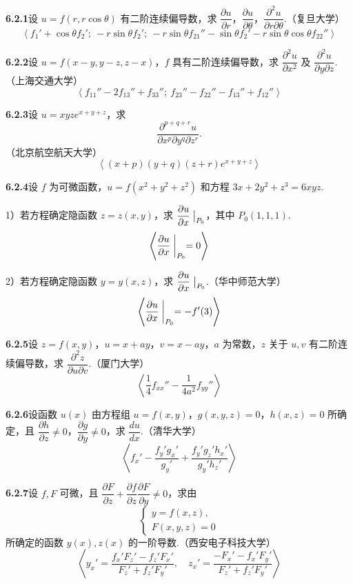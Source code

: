 \documentclass[UTF8,12pt,a4paper,fontset=fandol]{ctexart}
\begin{document}
\noindent\textbf{6.2.1}\quad 设 $u=f(r,r\cos\theta)$ 有二阶连续偏导数，求 $\dfrac{\partial u}{\partial r}$，$\dfrac{\partial u}{\partial\theta}$，$\dfrac{\partial^2u}{\partial r\partial\theta}$.（复旦大学）
\[
  \left\langle f_1'+\cos\theta f_2';\ -r\sin\theta f_2';\
  -r\sin\theta f_{21}''-\sin\theta f_2'-r\sin\theta\cos\theta f_{22}''\right\rangle
\]

\noindent\textbf{6.2.2}\quad 设 $u=f(x-y,y-z,z-x)$，$f$ 具有二阶连续偏导数，求 $\dfrac{\partial^2u}{\partial x^2}$ 及 $\dfrac{\partial^2u}{\partial y\partial z}$.（上海交通大学）
\[
  \left\langle f_{11}''-2f_{13}''+f_{33}'';\
  f_{23}''-f_{22}''-f_{13}''+f_{12}''\right\rangle
\]

\noindent\textbf{6.2.3}\quad 设 $u=xyze^{x+y+z}$，求
\[
  \frac{\partial^{p+q+r}u}{\partial x^p\partial y^q\partial z^r}.
\]
（北京航空航天大学）
\[
  \left\langle (x+p)(y+q)(z+r)e^{x+y+z}\right\rangle
\]

\noindent\textbf{6.2.4}\quad 设 $f$ 为可微函数，$u=f(x^2+y^2+z^2)$ 和方程 $3x+2y^2+z^3=6xyz$.

1）若方程确定隐函数 $z=z(x,y)$，求 $\dfrac{\partial u}{\partial x}\bigm|_{P_0}$，其中 $P_0(1,1,1)$.
\[
  \left\langle \frac{\partial u}{\partial x}\biggm|_{P_0}=0\right\rangle
\]

2）若方程确定隐函数 $y=y(x,z)$，求 $\dfrac{\partial u}{\partial x}\bigm|_{P_0}$.（华中师范大学）
\[
  \left\langle \frac{\partial u}{\partial x}\biggm|_{P_0}=-f'(3)\right\rangle
\]

\noindent\textbf{6.2.5}\quad 设 $z=f(x,y)$，$u=x+ay$，$v=x-ay$，$a$ 为常数，$z$ 关于 $u,v$ 有二阶连续偏导数，求 $\dfrac{\partial^2z}{\partial u\partial v}$.（厦门大学）
\[
  \left\langle \frac14f_{xx}''-\frac1{4a^2}f_{yy}''\right\rangle
\]

\noindent\textbf{6.2.6}\quad 设函数 $u(x)$ 由方程组 $u=f(x,y)$，$g(x,y,z)=0$，$h(x,z)=0$ 所确定，且 $\dfrac{\partial h}{\partial z}\ne0$，$\dfrac{\partial g}{\partial y}\ne0$，求 $\dfrac{du}{dx}$.（清华大学）
\[
  \left\langle f_x'-\frac{f_y'g_x'}{g_y'}+\frac{f_y'g_z'h_x'}{g_y'h_z'}\right\rangle
\]

\noindent\textbf{6.2.7}\quad 设 $f,F$ 可微，且 $\dfrac{\partial F}{\partial z}+\dfrac{\partial f}{\partial z}\dfrac{\partial F}{\partial y}\ne0$，求由
\[
  \begin{cases}
  y=f(x,z),\\
  F(x,y,z)=0
  \end{cases}
\]
所确定的函数 $y(x),z(x)$ 的一阶导数.（西安电子科技大学）
\[
  \left\langle
  y_x'=\frac{f_x'F_z'-f_z'F_x'}{F_z'+f_z'F_y'},\quad
  z_x'=\frac{-F_x'-f_x'F_y'}{F_z'+f_z'F_y'}
  \right\rangle
\]
\end{document}
